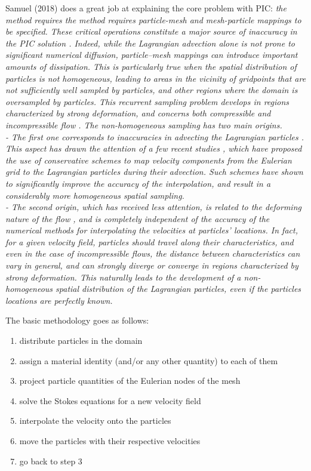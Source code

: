 Samuel (2018) \cite{samu18} does a great job at explaining 
the core problem with PIC: {\it the method requires the method requires particle-mesh 
and mesh-particle mappings to be specified. These critical operations constitute a
major source of inaccuracy in the PIC solution \cite{mona85,dumg11,thmk14}. 
Indeed, while the Lagrangian advection alone is not prone
to significant numerical diffusion, particle–mesh mappings can introduce 
important amounts of dissipation. This is particularly true
when the spatial distribution of particles is not homogeneous, leading 
to areas in the vicinity of gridpoints that are not sufficiently
well sampled by particles, and other regions where the domain is
oversampled by particles. This recurrent sampling problem develops 
in regions characterized by strong deformation, and concerns
both compressible and incompressible flow \cite{waav15,pukp16}. 
The non-homogeneous sampling has two main
origins. \\
- The first one corresponds to inaccuracies in advecting the
Lagrangian particles \cite{meje04}. This aspect has drawn
the attention of a few recent studies \cite{waav15,pukp16}, 
which have proposed the use of conservative schemes to
map velocity components from the Eulerian grid to the Lagrangian
particles during their advection. Such schemes have shown to significantly 
improve the accuracy of the interpolation, and result in
a considerably more homogeneous spatial sampling. \\
- The second origin, which has received less attention, is related to the deforming
nature of the flow \cite{modm03}, and is completely independent 
of the accuracy of the numerical methods for interpolating
the velocities at particles’ locations. In fact, for a given velocity
field, particles should travel along their characteristics, and even in
the case of incompressible flows, the distance between characteristics 
can vary in general, and can strongly diverge or converge in
regions characterized by strong deformation. This naturally leads to
the development of a non-homogeneous spatial distribution of the
Lagrangian particles, even if the particles locations are perfectly
known.}



The basic methodology goes as follows:
\begin{enumerate}
\item distribute particles in the domain
\item assign a material identity (and/or any other quantity) to each of them
\item project particle quantities of the Eulerian nodes of the mesh
\item solve the Stokes equations for a new velocity field
\item interpolate the velocity onto the particles
\item move the particles with their respective velocities 
\item go back to step 3
\end{enumerate}  

